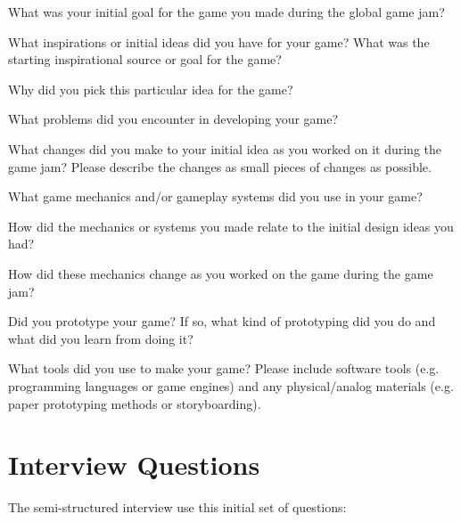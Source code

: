 \documentclass[]{article}
\begin{document}
\begin{list}{}{\leftmargin=10pt \itemindent=0em \itemsep=0pt}
\item What was your initial goal for the game you made during the global game jam?
\item What inspirations or initial ideas did you have for your game? What was the starting inspirational source or goal for the game?
\item Why did you pick this particular idea for the game?
\item What problems did you encounter in developing your game?
\item What changes did you make to your initial idea as you worked on it during the game jam? Please describe the changes as small pieces of changes as possible.
\item What game mechanics and/or gameplay systems did you use in your game?
\item How did the mechanics or systems you made relate to the initial design ideas you had?
\item How did these mechanics change as you worked on the game during the game jam?
\item Did you prototype your game? If so, what kind of prototyping did you do and what did you learn from doing it?
\item What tools did you use to make your game? Please include software tools (e.g. programming languages or game engines) and any physical/analog materials (e.g. paper prototyping methods or storyboarding).
\end{list}


\section{Interview Questions}
\label{sec:interview_questions}

The semi-structured interview use this initial set of questions:
\end{document}
